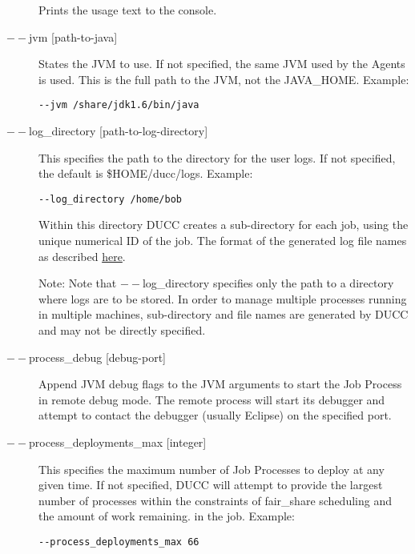 \begin{description}
             Prints the usage text to the console. 

           \item[$--$jvm {[path-to-java]}  ]

             States the JVM to use. If not specified, the same JVM used by the Agents is used.  This is
             the full path to the JVM, not the JAVA\_HOME.
             Example: 
\begin{verbatim}
--jvm /share/jdk1.6/bin/java 
\end{verbatim}
             
           \item[$--$log\_directory {[path-to-log-directory]} ]

             This specifies the path to the directory for the user logs. If not specified, the default is
             \$HOME/ducc/logs. Example: 
             \begin{verbatim}
--log_directory /home/bob 
             \end{verbatim}
             
             Within this directory DUCC creates a sub-directory for each job, using the unique numerical 
             ID of the job. The format of the generated log file names as described
             \hyperref[chap:job-logs]{here}.
             
             Note: Note that $--$log\_directory specifies only the path to a directory where 
             logs are to be stored. In order to manage multiple processes running in multiple 
             machines, sub-directory and file names are generated by DUCC and may 
             not be directly specified. 

           \item[$--$process\_debug {[debug-port]}] Append JVM debug flags to the JVM
             arguments to start the Job Process in remote debug mode.  The remote process will start
             its debugger and attempt to contact the debugger (usually Eclipse) on the specified
             port.
             
           \item[$--$process\_deployments\_max {[integer]} ]

             This specifies the maximum number of Job Processes to deploy at any given time. If not 
             specified, DUCC will attempt to provide the largest number of processes within the 
             constraints of fair\_share scheduling and the amount of work remaining.
             in the job. Example:
             \begin{verbatim}
--process_deployments_max 66 
             \end{verbatim}



\end{description}
